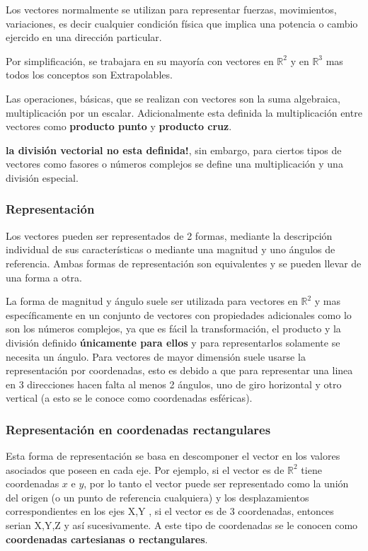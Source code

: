     Los vectores normalmente se utilizan para representar fuerzas, movimientos,
    variaciones, es decir cualquier condición física que implica una potencia o
    cambio ejercido en una dirección particular.

    Por simplificación, se trabajara en su mayoría con vectores en
    $\mathbb{R}^2$ y en $\mathbb{R}^3$ mas todos los conceptos son
    Extrapolables.

    Las operaciones, básicas, que se realizan con vectores son la suma
    algebraica, multiplicación por un escalar. Adicionalmente esta definida la
    multiplicación entre vectores como \textbf{producto punto} y
    \textbf{producto cruz}.

    \textbf{la división vectorial no esta definida!}, sin embargo, para ciertos
    tipos de vectores como fasores o números complejos se define una
    multiplicación y una división especial.



    \subsubsection{Representación}

    Los vectores pueden ser representados de 2 formas, mediante la descripción
    individual de sus características o mediante una magnitud y uno ángulos de
    referencia. Ambas formas de representación son equivalentes y se pueden
    llevar de una forma a otra.

    La forma de magnitud y ángulo suele ser utilizada para vectores en
    $\mathbb{R}^2$ y mas específicamente en un conjunto de vectores con propiedades
    adicionales como lo son los números complejos, ya que es fácil la
    transformación, el producto y la división definido \textbf{únicamente para
    ellos} y para representarlos solamente se necesita un
    ángulo. Para vectores de mayor dimensión suele usarse la representación por
    coordenadas, esto es debido a que para representar una linea en 3
    direcciones hacen falta al menos 2 ángulos, uno de giro horizontal y otro
    vertical (a esto se le conoce como coordenadas esféricas).


    \subsubsection{Representación en coordenadas rectangulares}

    Esta forma de representación se basa en descomponer el vector en los
    valores asociados que poseen en cada eje. Por ejemplo, si el vector es de
    $\mathbb{R}^2$ tiene coordenadas $x$ e $y$, por lo tanto el vector puede
    ser representado como la unión del origen (o un punto de referencia
    cualquiera) y los desplazamientos correspondientes en los ejes X,Y , si el
    vector es de 3 coordenadas, entonces serian X,Y,Z y así sucesivamente. A
    este tipo de coordenadas se le conocen como \textbf{ coordenadas
    cartesianas o rectangulares}.


